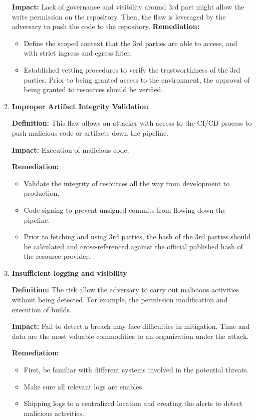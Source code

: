 \begin{enumerate}[label=(\arabic*)]
    \textbf{Impact: }
        Lack of governance and visibility around 3rd part might allow the write permission on the repository.
        Then, the flaw is leveraged by the adversary to push the code to the repository.
    \textbf{Remediation:}
        \begin{itemize}
            \item Define the scoped context that the 3rd parties are able to access, and with strict ingress
            and egress filter.
            \item Established vetting procedures to verify the trustworthiness of the 3rd parties. Prior to being 
            granted access to the environment, the approval of being granted to resources should be verified.
        \end{itemize}
    \item \textbf{Improper Artifact Integrity Validation}

    \textbf{Definition: }
        This flaw allows an attacker with access to the CI/CD process to push malicious code or artifacts down 
        the pipeline.

    \textbf{Impact: }
        Execution of malicious code.

    \textbf{Remediation:}
        \begin{itemize}
            \item Validate the integrity of resources all the way from development to production.
            \item Code signing to prevent unsigned commits from flowing down the pipeline.
            \item Prior to fetching and using 3rd parties, the hash of the 3rd parties should be calculated and 
            cross-referenced against the official published hash of the resource provider.
        \end{itemize}
        
    \item \textbf{Insufficient logging and visibility}

    \textbf{Definition: }
        The risk allow the adversary to carry out malicious activities without being detected.
        For example, the permission modification and execution of builds.

    \textbf{Impact: }
        Fail to detect a breach may face difficulties in mitigation. Time and data are the most 
        valuable commodities to an organization under the attack.

    \textbf{Remediation:}
        \begin{itemize}
            \item First, be familiar with different systems involved in the potential threats.
            \item Make sure all relevant logs are enables.
            \item Shipping logs to a centralized location and creating the alerts to detect malicious activities.
        \end{itemize}
\end{enumerate}



